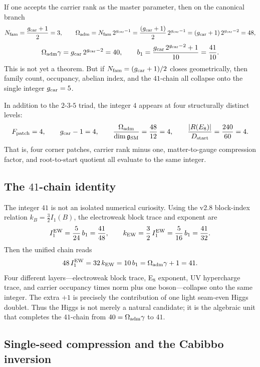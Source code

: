 \begin{remark}
If one accepts the carrier rank as the master parameter, then on the canonical branch
\[
N_{\mathrm{fam}}=\frac{g_{\mathrm{car}}+1}{2}=3,
\qquad
\Omega_{\mathrm{adm}}=N_{\mathrm{fam}}\,2^{g_{\mathrm{car}}-1}=\frac{(g_{\mathrm{car}}+1)}{2}\,2^{g_{\mathrm{car}}-1}=(g_{\mathrm{car}}+1)\,2^{g_{\mathrm{car}}-2}=48,
\]
\[
\Omega_{\mathrm{adm}}\gamma=g_{\mathrm{car}}\,2^{g_{\mathrm{car}}-2}=40,
\qquad
b_1=\frac{g_{\mathrm{car}}\,2^{g_{\mathrm{car}}-2}+1}{10}=\frac{41}{10}.
\]
This is not yet a theorem. But if $N_{\mathrm{fam}}=(g_{\mathrm{car}}+1)/2$ closes geometrically, then family count, occupancy, abelian index, and the $41$-chain all collapse onto the single integer $g_{\mathrm{car}}=5$.
\end{remark}

\begin{remark}
In addition to the $2$-$3$-$5$ triad, the integer $4$ appears at four structurally distinct levels:
\[
F_{\mathrm{patch}}=4,
\qquad
g_{\mathrm{car}}-1=4,
\qquad
\frac{\Omega_{\mathrm{adm}}}{\dim\mathfrak g_{\mathrm{SM}}}=\frac{48}{12}=4,
\qquad
\frac{|R(E_8)|}{D_{\mathrm{start}}}=\frac{240}{60}=4.
\]
That is, four corner patches, carrier rank minus one, matter-to-gauge compression factor, and root-to-start quotient all evaluate to the same integer.
\end{remark}

\subsection{The $41$-chain identity}

The integer $41$ is not an isolated numerical curiosity. Using the v2.8 block-index relation $k_B=\frac32 I_1(B)$, the electroweak block trace and exponent are
\[
I_1^{\mathrm{EW}}=\frac{5}{24}\,b_1=\frac{41}{48},
\qquad
k_{\mathrm{EW}}=\frac32\,I_1^{\mathrm{EW}}=\frac{5}{16}\,b_1=\frac{41}{32}.
\]
Then the unified chain reads
\begin{equation}
\label{eq:41-chain-main}
48\,I_1^{\mathrm{EW}}
=32\,k_{\mathrm{EW}}
=10\,b_1
=\Omega_{\mathrm{adm}}\gamma+1
=41.
\end{equation}
Four different layers---electroweak block trace, E$_8$ exponent, UV hypercharge trace, and carrier occupancy times norm plus one boson---collapse onto the same integer. The extra $+1$ is precisely the contribution of one light seam-even Higgs doublet. Thus the Higgs is not merely a natural candidate; it is the algebraic unit that completes the $41$-chain from $40=\Omega_{\mathrm{adm}}\gamma$ to $41$.

\subsection{Single-seed compression and the Cabibbo inversion}

